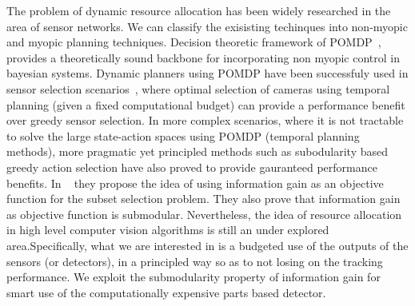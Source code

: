 \documentclass[10pt,twocolumn,letterpaper]{article}
\begin{document}
The problem of dynamic resource allocation has been widely researched in the area of sensor networks. We can classify the exisisting techinques into non-myopic and myopic planning techniques.  Decision theoretic framework of POMDP~\cite{Kaelbling98}, provides a theoretically sound backbone for incorporating non myopic control in bayesian systems. Dynamic planners using POMDP have been successfuly used in sensor selection scenarios~\cite{Spaan09}, where optimal selection of cameras using temporal planning (given a  fixed computational budget) can provide a performance benefit over greedy sensor selection. In more complex scenarios, where it is not tractable to solve the large state-action spaces using POMDP (temporal planning methods), more pragmatic yet principled methods such as subodularity based greedy action selection have also proved to provide gauranteed performance benefits. In ~\cite{krause2012near} they propose the idea of using information gain as an objective function for the subset selection problem. They also prove that information gain as objective function is submodular. Nevertheless, the idea of resource allocation in high level computer vision algorithms is still an under explored area.Specifically, what we are interested in is a budgeted use of the outputs of the sensors (or detectors), in a principled way so as to not losing on the tracking performance. We exploit the submodularity property of information gain for smart use of the computationally expensive parts based detector.

 
\end{document}
